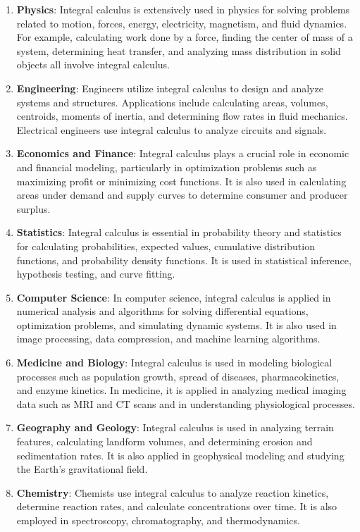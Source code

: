 \begin{enumerate}
    \item \textbf{Physics}: Integral calculus is extensively used in physics for solving problems related to motion, forces, energy, electricity, magnetism, and fluid dynamics. For example, calculating work done by a force, finding the center of mass of a system, determining heat transfer, and analyzing mass distribution in solid objects all involve integral calculus.
    
    \item \textbf{Engineering}: Engineers utilize integral calculus to design and analyze systems and structures. Applications include calculating areas, volumes, centroids, moments of inertia, and determining flow rates in fluid mechanics. Electrical engineers use integral calculus to analyze circuits and signals.
    
    \item \textbf{Economics and Finance}: Integral calculus plays a crucial role in economic and financial modeling, particularly in optimization problems such as maximizing profit or minimizing cost functions. It is also used in calculating areas under demand and supply curves to determine consumer and producer surplus.
    
    \item \textbf{Statistics}: Integral calculus is essential in probability theory and statistics for calculating probabilities, expected values, cumulative distribution functions, and probability density functions. It is used in statistical inference, hypothesis testing, and curve fitting.
    
    \item \textbf{Computer Science}: In computer science, integral calculus is applied in numerical analysis and algorithms for solving differential equations, optimization problems, and simulating dynamic systems. It is also used in image processing, data compression, and machine learning algorithms.
    
    \item \textbf{Medicine and Biology}: Integral calculus is used in modeling biological processes such as population growth, spread of diseases, pharmacokinetics, and enzyme kinetics. In medicine, it is applied in analyzing medical imaging data such as MRI and CT scans and in understanding physiological processes.
    
    \item \textbf{Geography and Geology}: Integral calculus is used in analyzing terrain features, calculating landform volumes, and determining erosion and sedimentation rates. It is also applied in geophysical modeling and studying the Earth's gravitational field.
    
    \item \textbf{Chemistry}: Chemists use integral calculus to analyze reaction kinetics, determine reaction rates, and calculate concentrations over time. It is also employed in spectroscopy, chromatography, and thermodynamics.
\end{enumerate}

